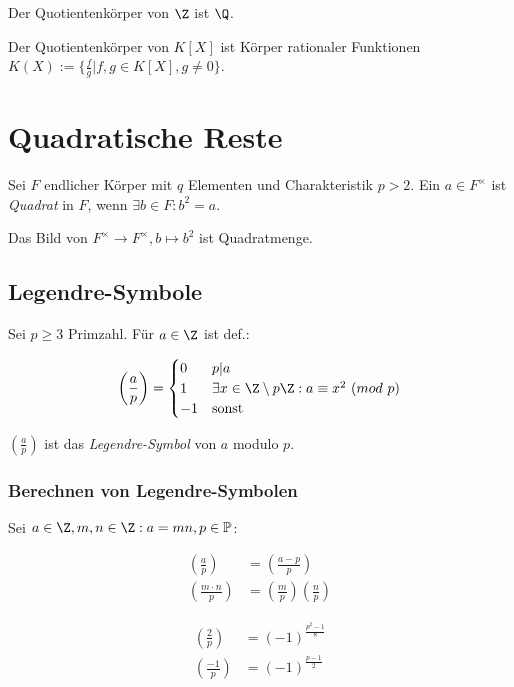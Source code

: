 \vspace*{2mm}

Der Quotientenkörper von $\Z$ ist $\Q$.

Der Quotientenkörper von $K[X]$ ist Körper rationaler Funktionen $K(X) := \{ \frac{f}{g} | f, g \in K[X], g \neq 0 \}$.

\section*{Quadratische Reste}

Sei $F$ endlicher Körper mit $q$ Elementen und Charakteristik $p > 2$. Ein $a \in F^\times$ ist \emph{Quadrat} in $F$, wenn $\exists b \in F : b^2 = a$.

Das Bild von $F^\times \to F^\times, b \mapsto b^2$ ist Quadratmenge.

\subsection*{Legendre-Symbole}

\newcommand{\legendre}[2]{\left(\frac{#1}{#2}\right)}

Sei $p \geq 3$ Primzahl. Für $a \in \Z$ ist def.:

\vspace*{-2mm}
$$\legendre{a}{p} = \begin{cases}
	0  & p | a \\
	1  & \exists x \in \Z \setminus p\Z : a \equiv x^2 \ (mod \ p) \\
	-1 & \text{sonst}
\end{cases}$$

$\legendre{a}{p}$ ist das \emph{Legendre-Symbol} von $a$ modulo $p$.

\subsubsection*{Berechnen von Legendre-Symbolen}

Sei $a \in \Z, m, n \in \Z : a=mn, p \in \Primes$:

\vspace*{-4mm}
\begin{align*}
	\legendre{a}{p} &= \legendre{a-p}{p} \\
	\legendre{m \cdot n}{p} &= \legendre{m}{p}\legendre{n}{p}
\end{align*}

\pagebreak

\vspace*{-8mm}
\begin{align*}
	\legendre{2}{p} &= (-1)^{\frac{p^2-1}{8}} \\
	\legendre{-1}{p} &= (-1)^{\frac{p-1}{2}}
\end{align*}

